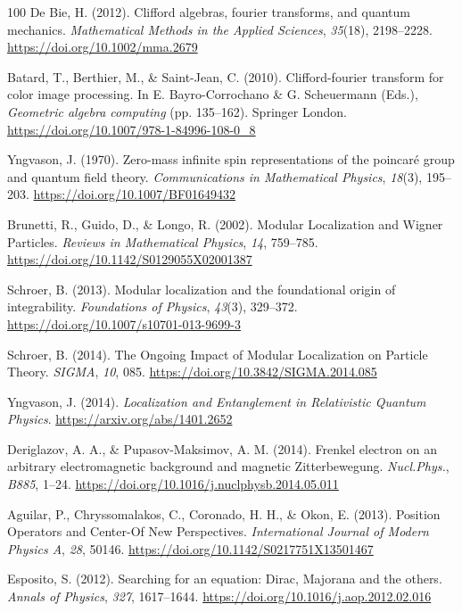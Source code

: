 \documentclass[11pt]{book}
\begin{document}
\begin{thebibliography}{100}
 De Bie, H. (2012). Clifford algebras, fourier transforms, and quantum
mechanics. \emph{Mathematical Methods in the Applied Sciences},
\emph{35}(18), 2198--2228. \url{https://doi.org/10.1002/mma.2679}

 Batard, T., Berthier, M., \& Saint-Jean, C. (2010). Clifford-fourier
transform for color image processing. In E. Bayro-Corrochano \& G.
Scheuermann (Eds.), \emph{Geometric algebra computing} (pp. 135--162).
Springer London. \url{https://doi.org/10.1007/978-1-84996-108-0_8}

 Yngvason, J. (1970). Zero-mass infinite spin representations of the
poincaré group and quantum field theory. \emph{Communications in
Mathematical Physics}, \emph{18}(3), 195--203.
\url{https://doi.org/10.1007/BF01649432}

 Brunetti, R., Guido, D., \& Longo, R. (2002). Modular Localization and
Wigner Particles. \emph{Reviews in Mathematical Physics}, \emph{14},
759--785. \url{https://doi.org/10.1142/S0129055X02001387}

 Schroer, B. (2013). Modular localization and the foundational origin of
integrability. \emph{Foundations of Physics}, \emph{43}(3), 329--372.
\url{https://doi.org/10.1007/s10701-013-9699-3}

 Schroer, B. (2014). The Ongoing Impact of Modular Localization on
Particle Theory. \emph{SIGMA}, \emph{10}, 085.
\url{https://doi.org/10.3842/SIGMA.2014.085}

 Yngvason, J. (2014). \emph{Localization and Entanglement in Relativistic
Quantum Physics}. \url{https://arxiv.org/abs/1401.2652}

 Deriglazov, A. A., \& Pupasov-Maksimov, A. M. (2014). Frenkel electron
on an arbitrary electromagnetic background and magnetic Zitterbewegung.
\emph{Nucl.Phys.}, \emph{B885}, 1--24.
\url{https://doi.org/10.1016/j.nuclphysb.2014.05.011}

 Aguilar, P., Chryssomalakos, C., Coronado, H. H., \& Okon, E. (2013).
Position Operators and Center-Of New Perspectives. \emph{International
Journal of Modern Physics A}, \emph{28}, 50146.
\url{https://doi.org/10.1142/S0217751X13501467}

 Esposito, S. (2012). Searching for an equation: Dirac, Majorana and the
others. \emph{Annals of Physics}, \emph{327}, 1617--1644.
\url{https://doi.org/10.1016/j.aop.2012.02.016}


\end{thebibliography}
\end{document}
